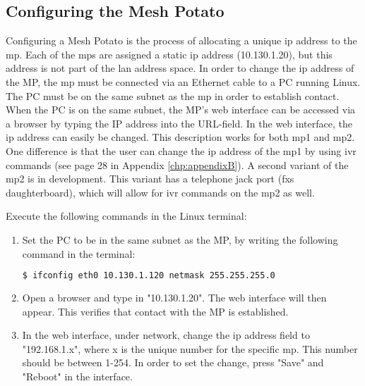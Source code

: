 \subsection{Configuring the Mesh Potato}
\label{subsec:configuring}
Configuring a Mesh Potato is the process of allocating a unique \gls{ip} address to the \gls{mp}. Each of the \glspl{mp} are assigned a static \gls{ip} address (10.130.1.20), but this address is not part of the \gls{lan} address space. In order to change the \gls{ip} address of the MP, the \gls{mp} must be connected via an Ethernet cable to a PC running Linux. The PC must be on the same subnet as the \gls{mp} in order to establish contact. When the PC is on the same subnet, the MP's web interface can be accessed via a browser by typing the IP address into the URL-field. In the web interface, the \gls{ip} address can easily be changed. This description works for both \gls{mp1} and \gls{mp2}. One difference is that the user can change the \gls{ip} address of the \gls{mp1} by using \gls{ivr} commands (see page 28 in Appendix \ref{chp:appendixB}). A second variant of the \gls{mp2} is in development. This variant has a telephone jack port (\gls{fxs} daughterboard), which will allow for \gls{ivr} commands on the \gls{mp2} as well. 

Execute the following commands in the Linux terminal:
\begin{enumerate}
\item Set the PC to be in the same subnet as the MP, by writing the following command in the terminal:
\noindent
\begin{lstlisting}[language=bash]
  $ ifconfig eth0 10.130.1.120 netmask 255.255.255.0
\end{lstlisting}
\item Open a browser and type in "10.130.1.20". The web interface will then appear. This verifies that contact with the MP is established. 
\item In the web interface, under network, change the \gls{ip} address field to "192.168.1.x", where x is the unique number for the specific \gls{mp}. This number should be between 1-254. In order to set the change, press "Save" and "Reboot" in the interface. 
\end{enumerate}

